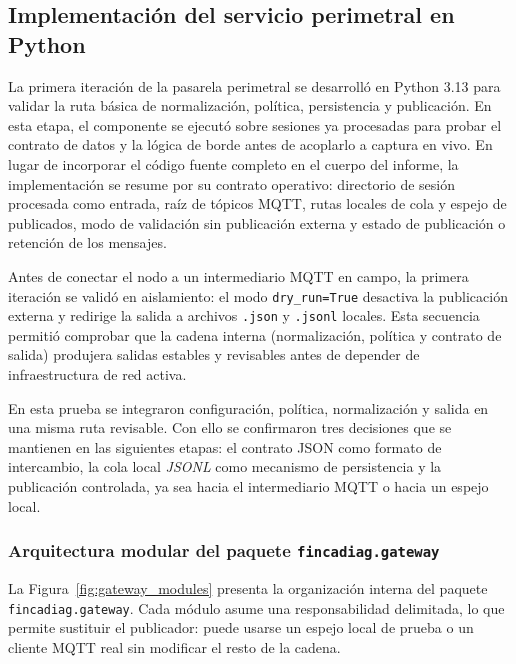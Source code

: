 \subsection{Implementación del servicio perimetral en Python}
La primera iteración de la pasarela perimetral se desarrolló en Python 3.13 para validar la ruta básica de normalización, política, persistencia y publicación. En esta etapa, el componente se ejecutó sobre sesiones ya procesadas para probar el contrato de datos y la lógica de borde antes de acoplarlo a captura en vivo. En lugar de incorporar el código fuente completo en el cuerpo del informe, la implementación se resume por su contrato operativo: directorio de sesión procesada como entrada, raíz de tópicos \ac{MQTT}, rutas locales de cola y espejo de publicados, modo de validación sin publicación externa y estado de publicación o retención de los mensajes.

Antes de conectar el nodo a un intermediario \ac{MQTT} en campo, la primera iteración se validó en aislamiento: el modo \texttt{dry\_run=True} desactiva la publicación externa y redirige la salida a archivos \texttt{.json} y \texttt{.jsonl} locales. Esta secuencia permitió comprobar que la cadena interna (normalización, política y contrato de salida) produjera salidas estables y revisables antes de depender de infraestructura de red activa.

En esta prueba se integraron configuración, política, normalización y salida en una misma ruta revisable. Con ello se confirmaron tres decisiones que se mantienen en las siguientes etapas: el contrato \ac{JSON} como formato de intercambio, la cola local \textit{JSONL} como mecanismo de persistencia y la publicación controlada, ya sea hacia el intermediario \ac{MQTT} o hacia un espejo local.

\subsubsection{Arquitectura modular del paquete \texttt{fincadiag.\allowbreak gateway}}
La Figura~\ref{fig:gateway_modules} presenta la organización interna del paquete \texttt{fincadiag.\allowbreak gateway}. Cada módulo asume una responsabilidad delimitada, lo que permite sustituir el publicador: puede usarse un espejo local de prueba o un cliente \ac{MQTT} real sin modificar el resto de la cadena.

